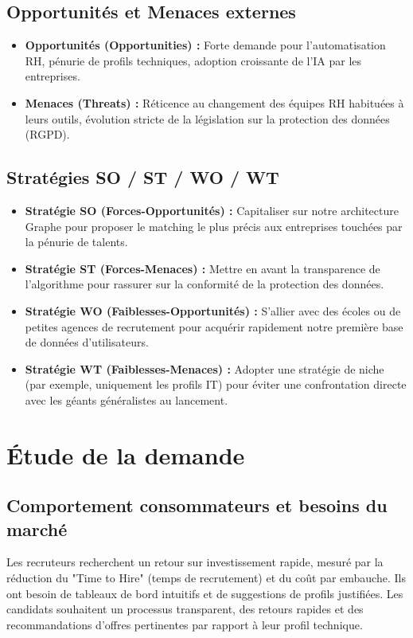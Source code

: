 \documentclass[12pt,a4paper]{report}
\begin{document}
\subsection{Opportunités et Menaces externes}
\begin{itemize}
    \item \textbf{Opportunités (Opportunities) :} Forte demande pour l'automatisation RH, pénurie de profils techniques, adoption croissante de l'IA par les entreprises.
    \item \textbf{Menaces (Threats) :} Réticence au changement des équipes RH habituées à leurs outils, évolution stricte de la législation sur la protection des données (RGPD).
\end{itemize}

\subsection{Stratégies SO / ST / WO / WT}
\begin{itemize}
    \item \textbf{Stratégie SO (Forces-Opportunités) :} Capitaliser sur notre architecture Graphe pour proposer le matching le plus précis aux entreprises touchées par la pénurie de talents.
    \item \textbf{Stratégie ST (Forces-Menaces) :} Mettre en avant la transparence de l'algorithme pour rassurer sur la conformité de la protection des données.
    \item \textbf{Stratégie WO (Faiblesses-Opportunités) :} S'allier avec des écoles ou de petites agences de recrutement pour acquérir rapidement notre première base de données d'utilisateurs.
    \item \textbf{Stratégie WT (Faiblesses-Menaces) :} Adopter une stratégie de niche (par exemple, uniquement les profils IT) pour éviter une confrontation directe avec les géants généralistes au lancement.
\end{itemize}

\section{Étude de la demande}

\subsection{Comportement consommateurs et besoins du marché}
Les recruteurs recherchent un retour sur investissement rapide, mesuré par la réduction du "Time to Hire" (temps de recrutement) et du coût par embauche. Ils ont besoin de tableaux de bord intuitifs et de suggestions de profils justifiées. Les candidats souhaitent un processus transparent, des retours rapides et des recommandations d'offres pertinentes par rapport à leur profil technique.
\end{document}
